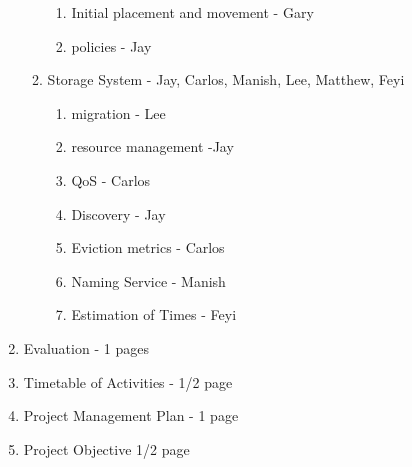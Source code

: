 \begin{enumerate}
\begin{enumerate}
\begin{enumerate}
            \item Initial placement and movement  - Gary
            \item policies - Jay
          \end{enumerate}
      \item Storage System - Jay, Carlos, Manish, Lee, Matthew, Feyi
      \begin{enumerate}
         \item migration - Lee
         \item resource management -Jay
         \item QoS - Carlos 
         \item Discovery - Jay
         \item Eviction metrics - Carlos
         \item Naming Service - Manish
         \item Estimation of Times - Feyi
      \end{enumerate}
    \end{enumerate}
\item Evaluation - 1 pages
\item Timetable of Activities - 1/2 page
\item Project Management Plan - 1 page
\item Project Objective  1/2 page
\end{enumerate}

\vfill
